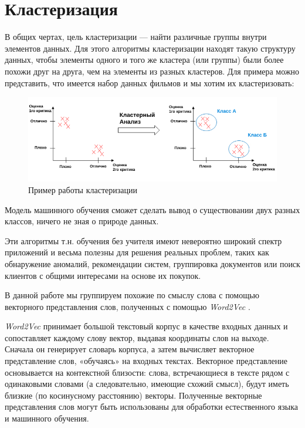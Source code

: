 \section{Кластеризация}

В общих чертах, цель кластеризации --- найти различные группы внутри элементов данных. Для этого алгоритмы кластеризации находят такую структуру данных, чтобы элементы одного и того же кластера (или группы) были более похожи друг на друга, чем на элементы из разных кластеров. Для примера можно представить, что имеется набор данных фильмов и мы
хотим их кластеризовать:


\begin{figure}[H]
\centering
\includegraphics[scale=0.6]{pics/clustering.png}
\caption{Пример работы кластеризации}
\end{figure}


Модель машинного обучения сможет сделать вывод о существовании двух разных классов, ничего не зная о природе данных.

Эти алгоритмы т.н. обучения без учителя имеют невероятно широкий спектр приложений и весьма полезны для решения реальных проблем, таких как обнаружение аномалий, рекомендации систем, группировка документов или поиск клиентов с общими интересами на основе их покупок.

В данной работе мы группируем похожие по смыслу слова с помощью векторного представления слов, полученных с помощью \textit{Word2Vec} \cite{bib5}. 

\textit{Word2Vec} принимает большой текстовый корпус в качестве входных данных и сопоставляет каждому слову вектор, выдавая координаты слов на выходе. Сначала он генерирует словарь корпуса, а затем вычисляет векторное представление слов, «обучаясь» на входных текстах. Векторное представление основывается на контекстной близости: слова, встречающиеся в тексте рядом с одинаковыми словами (а следовательно, имеющие схожий смысл), будут иметь близкие (по косинусному расстоянию) векторы. Полученные векторные представления слов могут быть использованы для обработки естественного языка и машинного обучения.
